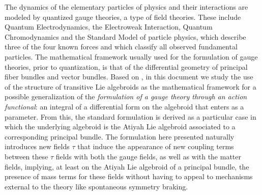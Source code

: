 
The dynamics of the elementary particles of physics and their interactions are modeled by quantized gauge theories, a type of field theories. These include Quantum Electrodynamics, the Electroweak Interaction, Quantum Chromodynamics and the Standard Model of particle physics, which describe three of the four known forces and which classify all observed fundamental particles. The mathematical framework usually used for the formulation of gauge theories, prior to quantization, is that of the differential geometry of principal fiber bundles and vector bundles. Based on \cite{Fournel2013, Fournel2011, Lazzarini2012}, in this document we study the use of the structure of transitive Lie algebroids as the mathematical framework for a possible generalization of the \textit{formulation of a gauge theory through an action functional}: an integral of a differential form on the algebroid that enters as a parameter. From this, the standard formulation is derived as a particular case in which the underlying algebroid is the Atiyah Lie algebroid associated to a corresponding principal bundle. The formulation here presented naturally introduces new fields $\tau$ that induce the appearance of new coupling terms between these $\tau$ fields with both the gauge fields, as well as with the matter fields, implying, at least on the Atiyah Lie algebroid of a principal bundle, the presence of mass terms for these fields without having to appeal to mechanisms external to the theory like spontaneous symmetry braking.


